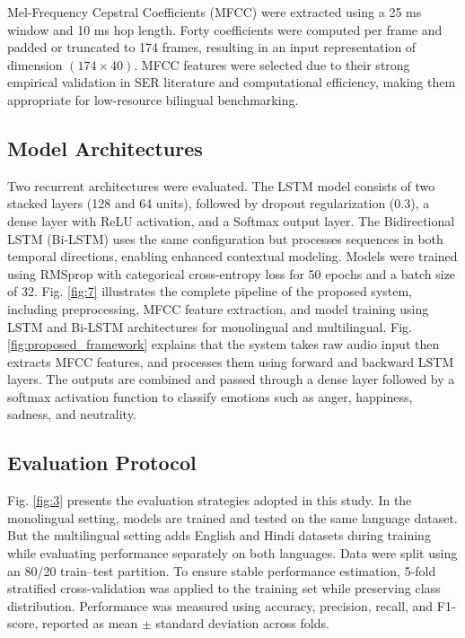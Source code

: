 \documentclass[runningheads]{llncs}
\begin{document}
Mel-Frequency Cepstral Coefficients (MFCC) were extracted using a 25 ms window and 10 ms hop length. Forty coefficients were computed per frame and padded or truncated to 174 frames, resulting in an input representation of dimension $(174 \times 40)$. MFCC features were selected due to their strong empirical validation in SER literature and computational efficiency, making them appropriate for low-resource bilingual benchmarking.

\subsection{Model Architectures}

Two recurrent architectures were evaluated. The LSTM model consists of two stacked layers (128 and 64 units), followed by dropout regularization (0.3), a dense layer with ReLU activation, and a Softmax output layer. The Bidirectional LSTM (Bi-LSTM) uses the same configuration but processes sequences in both temporal directions, enabling enhanced contextual modeling. Models were trained using RMSprop with categorical cross-entropy loss for 50 epochs and a batch size of 32. Fig. \ref{fig:7} illustrates the complete pipeline of the proposed system, including preprocessing, MFCC feature extraction, and model training using LSTM and Bi-LSTM architectures for monolingual and multilingual. Fig. \ref{fig:proposed_framework} explains that the system takes raw audio input then extracts MFCC features, and processes them using forward and backward LSTM layers. The outputs are combined and passed through a dense layer followed by a softmax activation function to classify emotions such as anger, happiness, sadness, and neutrality.

\subsection{Evaluation Protocol}

Fig. \ref{fig:3} presents the evaluation strategies adopted in this study. In the monolingual setting, models are trained and tested on the same language dataset. But the multilingual setting adds English and Hindi datasets during training while evaluating performance separately on both languages. Data were split using an 80/20 train–test partition. To ensure stable performance estimation, 5-fold stratified cross-validation was applied to the training set while preserving class distribution. Performance was measured using accuracy, precision, recall, and F1-score, reported as mean $\pm$ standard deviation across folds.
\end{document}
